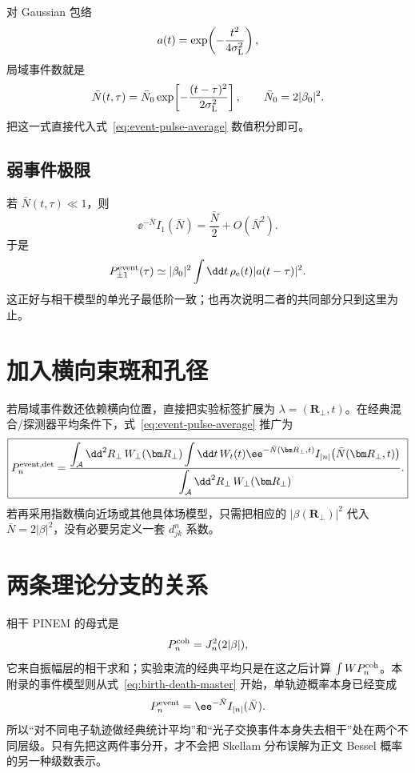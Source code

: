 对 Gaussian 包络
\begin{equation}
a(t)=\exp\!\left(-\frac{t^2}{4\sigma_{\rm L}^2}\right),
\end{equation}
局域事件数就是
\begin{equation}
\bar N(t,\tau)
=\bar N_0
\exp\!\left[-\frac{(t-\tau)^2}{2\sigma_{\rm L}^2}\right],
\qquad
\bar N_0=2|\beta_0|^2.
\end{equation}
把这一式直接代入式~\eqref{eq:event-pulse-average} 数值积分即可。

\subsection{弱事件极限}

若 \(\bar N(t,\tau)\ll1\)，则
\begin{equation}
\ee^{-\bar N}I_1(\bar N)
=\frac{\bar N}{2}+O(\bar N^2).
\end{equation}
于是
\begin{equation}
P_{\pm1}^{\rm event}(\tau)
\simeq
|\beta_0|^2
\int\dd t\,\rho_{\rm e}(t)|a(t-\tau)|^2.
\end{equation}
这正好与相干模型的单光子最低阶一致；也再次说明二者的共同部分只到这里为止。

\section{加入横向束斑和孔径}

若局域事件数还依赖横向位置，直接把实验标签扩展为
\(
\lambda=(\bm R_\perp,t)
\)。在经典混合/探测器平均条件下，式~\eqref{eq:event-pulse-average} 推广为
\begin{equation}
\boxed{
P_n^{\rm event,det}
=\frac{\displaystyle
\int_{\mathcal A}\dd^2R_\perp\,W_\perp(\bm R_\perp)
\int\dd t\,W_t(t)
\ee^{-\bar N(\bm R_\perp,t)}
I_{|n|}\!\left(\bar N(\bm R_\perp,t)\right)}
{\displaystyle
\int_{\mathcal A}\dd^2R_\perp\,W_\perp(\bm R_\perp)}.}
\label{eq:event-detector-average}
\end{equation}
若再采用指数横向近场或其他具体场模型，只需把相应的 \(|\beta(\bm R_\perp)|^2\) 代入
\(
\bar N=2|\beta|^2
\)，没有必要另定义一套 \(d_{jk}^n\) 系数。

\section{两条理论分支的关系}

相干 PINEM 的母式是
\begin{equation}
P_n^{\rm coh}=J_n^2(2|\beta|),
\end{equation}
它来自振幅层的相干求和；实验束流的经典平均只是在这之后计算
\(
\int W P_n^{\rm coh}
\)。本附录的事件模型则从式~\eqref{eq:birth-death-master} 开始，单轨迹概率本身已经变成
\begin{equation}
P_n^{\rm event}=\ee^{-\bar N}I_{|n|}(\bar N).
\end{equation}
所以“对不同电子轨迹做经典统计平均”和“光子交换事件本身失去相干”处在两个不同层级。只有先把这两件事分开，才不会把 Skellam 分布误解为正文 Bessel 概率的另一种级数表示。
